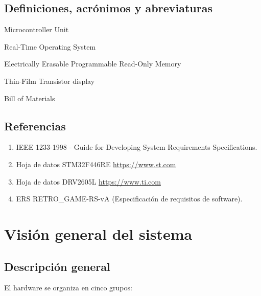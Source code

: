 \documentclass[11pt,a4paper]{article}
\begin{document}
\subsection{Definiciones, acrónimos y abreviaturas}
\begin{description}[labelwidth=2cm,labelindent=0.6cm]
  \item[MCU] Microcontroller Unit
  \item[RTOS] Real-Time Operating System
  \item[EEPROM] Electrically Erasable Programmable Read-Only Memory
  \item[TFT] Thin-Film Transistor display
  \item[BOM] Bill of Materials
\end{description}

\subsection{Referencias}
\begin{enumerate}
  \item IEEE 1233-1998 - Guide for Developing System Requirements Specifications.
  \item Hoja de datos STM32F446RE \url{https://www.st.com}
  \item Hoja de datos DRV2605L \url{https://www.ti.com}
  \item ERS RETRO\_GAME-RS-vA (Especificación de requisitos de software).
\end{enumerate}

\section{Visión general del sistema}

\subsection{Descripción general}
El hardware se organiza en cinco grupos:
\end{document}
